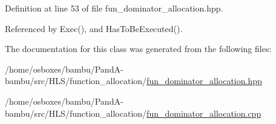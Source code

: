 Definition at line 53 of file fun\+\_\+dominator\+\_\+allocation.\+hpp.



Referenced by Exec(), and Has\+To\+Be\+Executed().



The documentation for this class was generated from the following files\+:\begin{DoxyCompactItemize}
\item 
/home/osboxes/bambu/\+Pand\+A-\/bambu/src/\+H\+L\+S/function\+\_\+allocation/\hyperlink{fun__dominator__allocation_8hpp}{fun\+\_\+dominator\+\_\+allocation.\+hpp}\item 
/home/osboxes/bambu/\+Pand\+A-\/bambu/src/\+H\+L\+S/function\+\_\+allocation/\hyperlink{fun__dominator__allocation_8cpp}{fun\+\_\+dominator\+\_\+allocation.\+cpp}\end{DoxyCompactItemize}
